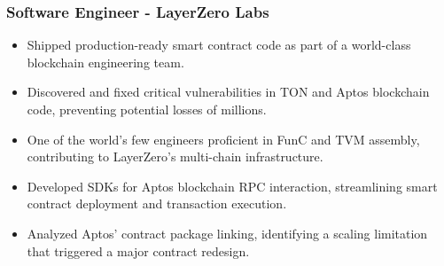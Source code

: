 \documentclass[10pt,letterpaper]{article}
\begin{document}
\begin{minipage}[t]{0.47\textwidth}
\subsubsection*{\textbf{Software Engineer} - LayerZero Labs}
\label{sec:org8ea673e}
\begin{itemize}
\item Shipped production-ready smart contract code as part of a world-class blockchain engineering team.
\item Discovered and fixed critical vulnerabilities in TON and Aptos blockchain code, preventing potential losses of millions.
\item One of the world's few engineers proficient in FunC and TVM assembly, contributing to LayerZero’s multi-chain infrastructure.
\item Developed SDKs for Aptos blockchain RPC interaction, streamlining smart contract deployment and transaction execution.
\item Analyzed Aptos’ contract package linking, identifying a scaling limitation that triggered a major contract redesign.
\end{itemize}

\end{minipage}
\hfill
\end{document}
